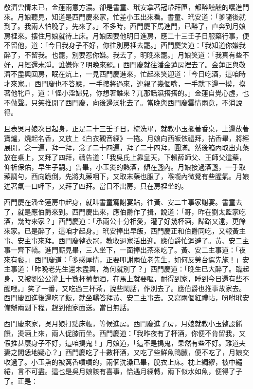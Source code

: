 敬濟雲情未已，金蓮雨意方濃。卻是書童、玳安拿著冠帶拜匣，都醉醺醺的嚷進門來。月娘聽見，知道是西門慶來家，忙差小玉出來看。書童、玳安道：「爹隨後就到了。我兩人怕晚了，先來了。」不多時，西門慶下馬進門，已醉了，直奔到月娘房裡來。摟住月娘就待上床。月娘因要他明日進房，應二十三壬子日服藥行事，便不留他，道：「今日我身子不好，你往別房裡去罷。」西門慶笑道：「我知道你嫌我醉了，不留我。也罷，別要惹你嫌。我去了，明晚來罷。」月娘笑道：「我真有些不好，月經還未凈。誰嫌你？明晚來罷。」西門慶就往潘金蓮房裡去了。金蓮正與敬濟不盡興回房，眠在炕上，一見西門慶進來，忙起來笑迎道：「今日吃酒，這咱時才來家。」西門慶也不答應，一手摟將過來，連親了幾個嘴，一手就下邊一摸，摸著他牝戶，道：「怪小淫婦兒，你想著誰來？兀那話濕搭搭的。」金蓮自覺心虛，也不做聲。只笑推開了西門慶，向後邊澡牝去了。當晚與西門慶雲情雨意，不消說得。

且表吳月娘次日起身，正是二十三壬子日，梳洗畢，就教小玉擺著香桌，上邊放著寶爐，燒起名香，又放上《白衣觀音經》一捲。月娘向西皈依禮拜，拈香畢，將經展開，念一遍，拜一拜，念了二十四遍，拜了二十四拜，圓滿。然後箱內取出丸藥放在桌上，又拜了四拜，禱告道：「我吳氏上靠皇天，下賴薛師父、王師父這藥，仰祈保佑，早生子嗣。」告畢，小玉燙的熱酒，傾在盞內。月娘接過酒盞，一手取藥調勻，西向跪倒，先將丸藥咽下，又取末藥也服了，喉嚨內微覺有些腥氣。月娘迸著氣一口呷下，又拜了四拜。當日不出房，只在房裡坐的。

西門慶在潘金蓮房中起身，就叫書童寫謝宴貼，往黃、安二主事家謝宴。書童去了，就是應伯爵來到。西門慶出來，應伯爵作了揖，說道：「哥，昨在劉太監家吃酒，幾時來家？」西門慶道：「承兩公十分相愛，灌了好幾杯酒，歸路又遠，更餘來家。已是醉了，這咱才起身。」玳安捧出早飯，西門慶正和伯爵同吃，又報黃主事、安主事來拜。西門慶整衣冠，教收過家活出迎。應伯爵忙迴避了。黃、安二主事一齊下轎。進門廝見畢，三人坐下，一面捧出茶來吃了。黃、安二主事道：「夜來有褻，」西門慶道：「多感厚情，正要叩謝兩位老先生，如何反勞台駕先施！」安主事道：「昨晚老先生還未盡興，為何就別了？」西門慶道：「晚生已大醉了。臨起身，又被劉公公灌上十數杯葡萄酒，在馬上就要嘔，耐得到家，睡到今日還有些不醒哩。」笑了一番，又吃過三杯茶，說些閑話，作別去了。應伯爵也推事故家去。西門慶回進後邊吃了飯，就坐轎答拜黃、安二主事去。又寫兩個紅禮帖，吩咐玳安備辦兩副下程，趕到他家面送。當日無話。

西門慶來家，吳月娘打點床帳，等候進房。西門慶進了房，月娘就教小玉整設餚饌，燙酒上來，兩人促膝而坐。西門慶道：「我昨夜有了杯酒，你便不肯留我，又假推甚麼身子不好，這咱搗鬼！」月娘道，「這不是搗鬼，果然有些不好。難道夫妻之間恁地疑心？」西門慶吃了十數杯酒，又吃了些鮮魚鴨臘，便不吃了，月娘交收過了。小玉熏的被窩香噴噴的，兩個洗澡已畢，脫衣上床。枕上綢繆，被中繾綣，言不可盡。這也是吳月娘該有喜事，恰遇月經轉，兩下似水如魚，便得了子了。正是：

